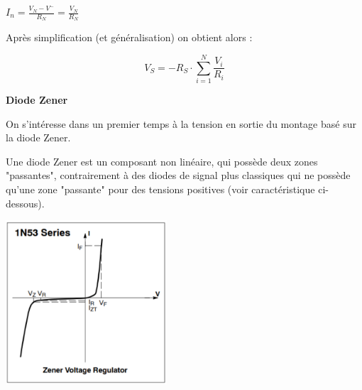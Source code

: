 \documentclass[a4paper,french]{paper}
\begin{document}
$I_n = \frac{V_N - V^-}{R_N} = \frac{V_N}{R_N}$

\medskip

Après simplification (et généralisation) on obtient alors :

$$V_{S} = -R_S \cdot \sum_{i=1}^{N} \frac{V_i}{R_i} $$


\newpage


\textbf{Diode Zener}

On s'intéresse dans un premier temps à la tension en sortie du montage basé sur la diode Zener.

Une diode Zener est un composant non linéaire, qui possède deux zones "passantes", contrairement à des diodes de signal plus classiques qui ne possède qu'une zone "passante" pour des tensions positives (voir caractéristique ci-dessous).

\begin{center}
\includegraphics[width=6cm]{images/zener_carac.png}
\end{center}
\end{document}
